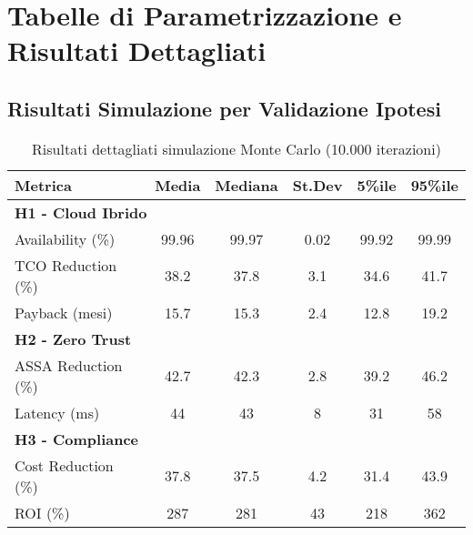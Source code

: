 \chapter{Tabelle di Parametrizzazione e Risultati Dettagliati}

\section{Risultati Simulazione per Validazione Ipotesi}

\begin{table}[htbp]
\centering
\begin{tabular}{lccccc}
\toprule
\textbf{Metrica} & \textbf{Media} & \textbf{Mediana} & \textbf{St.Dev} & \textbf{5\%ile} & \textbf{95\%ile} \\
\midrule
\multicolumn{6}{l}{\textbf{H1 - Cloud Ibrido}} \\
Availability (\%) & 99.96 & 99.97 & 0.02 & 99.92 & 99.99 \\
TCO Reduction (\%) & 38.2 & 37.8 & 3.1 & 34.6 & 41.7 \\
Payback (mesi) & 15.7 & 15.3 & 2.4 & 12.8 & 19.2 \\
\midrule
\multicolumn{6}{l}{\textbf{H2 - Zero Trust}} \\
ASSA Reduction (\%) & 42.7 & 42.3 & 2.8 & 39.2 & 46.2 \\
Latency (ms) & 44 & 43 & 8 & 31 & 58 \\
\midrule
\multicolumn{6}{l}{\textbf{H3 - Compliance}} \\
Cost Reduction (\%) & 37.8 & 37.5 & 4.2 & 31.4 & 43.9 \\
ROI (\%) & 287 & 281 & 43 & 218 & 362 \\
\bottomrule
\end{tabular}
\caption{Risultati dettagliati simulazione Monte Carlo (10.000 iterazioni)}
\end{table}
